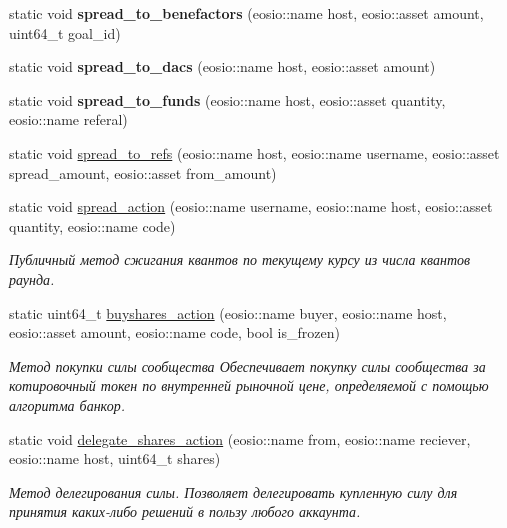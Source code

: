 \begin{DoxyCompactItemize}
static void {\bfseries spread\+\_\+to\+\_\+benefactors} (eosio\+::name host, eosio\+::asset amount, uint64\+\_\+t goal\+\_\+id)
\item 
\mbox{\label{classunicore_a97e2f30594f2b3dab8302e1c086b5a5d}} 
static void {\bfseries spread\+\_\+to\+\_\+dacs} (eosio\+::name host, eosio\+::asset amount)
\item 
\mbox{\label{classunicore_a5dab3c2359093e45f4e0b1fa5f41df29}} 
static void {\bfseries spread\+\_\+to\+\_\+funds} (eosio\+::name host, eosio\+::asset quantity, eosio\+::name referal)
\item 
static void \mbox{\hyperlink{classunicore_a0c2b0c3fffe564405122f21621aedb78}{spread\+\_\+to\+\_\+refs}} (eosio\+::name host, eosio\+::name username, eosio\+::asset spread\+\_\+amount, eosio\+::asset from\+\_\+amount)
\item 
\mbox{\label{classunicore_a128c65265d5c63d43c16f01220b06946}} 
static void \mbox{\hyperlink{classunicore_a128c65265d5c63d43c16f01220b06946}{spread\+\_\+action}} (eosio\+::name username, eosio\+::name host, eosio\+::asset quantity, eosio\+::name code)
\begin{DoxyCompactList}\small\item\em Публичный метод сжигания квантов по текущему курсу из числа квантов раунда. \end{DoxyCompactList}\item 
static uint64\+\_\+t \mbox{\hyperlink{classunicore_ab899e878b848c48c9f6656c74565970d}{buyshares\+\_\+action}} (eosio\+::name buyer, eosio\+::name host, eosio\+::asset amount, eosio\+::name code, bool is\+\_\+frozen)
\begin{DoxyCompactList}\small\item\em Метод покупки силы сообщества Обеспечивает покупку силы сообщества за котировочный токен по внутренней рыночной цене, определяемой с помощью алгоритма банкор. \end{DoxyCompactList}\item 
static void \mbox{\hyperlink{classunicore_ad357c4583f4d72f085919ad874bf0b28}{delegate\+\_\+shares\+\_\+action}} (eosio\+::name from, eosio\+::name reciever, eosio\+::name host, uint64\+\_\+t shares)
\begin{DoxyCompactList}\small\item\em Метод делегирования силы. Позволяет делегировать купленную силу для принятия каких-\/либо решений в пользу любого аккаунта. \end{DoxyCompactList}\item 

\end{DoxyCompactItemize}
